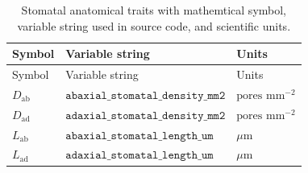 \documentclass[
  10pt,
]{article}
\begin{document}
\begin{longtable}[]{@{}
  >{\centering\arraybackslash}p{}
  >{\centering\arraybackslash}p{}
  >{\centering\arraybackslash}p{}@{}}
\caption{\label{tab:traits}Stomatal anatomical traits with mathemtical symbol, variable string used in source code, and scientific units.}\tabularnewline
\toprule
Symbol & Variable string & Units \\
\midrule
\endfirsthead
\toprule
Symbol & Variable string & Units \\
\midrule
\endhead
\(D_\mathrm{ab}\) & \(\mathtt{abaxial\_stomatal\_density\_mm2}\) & \(\text{pores mm}^{-2}\) \\
\(D_\mathrm{ad}\) & \(\mathtt{adaxial\_stomatal\_density\_mm2}\) & \(\text{pores mm}^{-2}\) \\
\(L_\mathrm{ab}\) & \(\mathtt{abaxial\_stomatal\_length\_um}\) & \(\mu\)m \\
\(L_\mathrm{ad}\) & \(\mathtt{adaxial\_stomatal\_length\_um}\) & \(\mu\)m \\
\bottomrule
\end{longtable}
\end{document}
